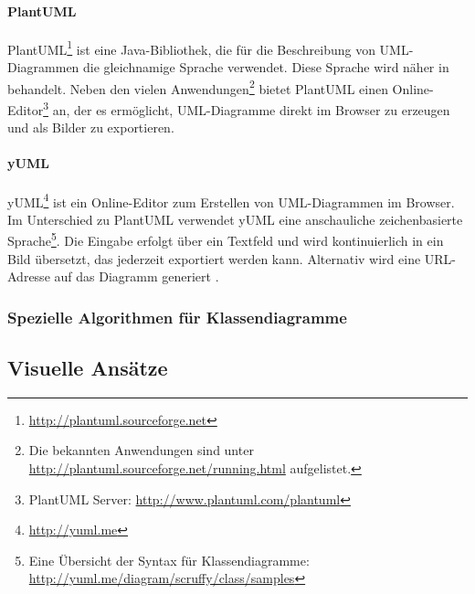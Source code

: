 \paragraph{PlantUML}


PlantUML\footnote{\url{http://plantuml.sourceforge.net}} ist eine Java-Bibliothek, die für die Beschreibung von UML-Diagrammen die gleichnamige Sprache verwendet. Diese Sprache wird näher in \cite{Roques10Drawing} behandelt. Neben den vielen Anwendungen\footnote{Die bekannten Anwendungen sind unter \url{http://plantuml.sourceforge.net/running.html} aufgelistet.} bietet PlantUML einen Online-Editor\footnote{PlantUML Server: \url{http://www.plantuml.com/plantuml}} an, der es ermöglicht, UML-Diagramme direkt im Browser zu erzeugen und als Bilder zu exportieren.

\paragraph{yUML}

yUML\footnote{\url{http://yuml.me}} ist ein Online-Editor zum Erstellen von UML-Diagrammen im Browser. Im Unterschied zu PlantUML verwendet yUML eine anschauliche zeichenbasierte Sprache\footnote{Eine Übersicht der Syntax für Klassendiagramme: \url{http://yuml.me/diagram/scruffy/class/samples}}. Die Eingabe erfolgt über ein Textfeld und wird kontinuierlich in ein Bild übersetzt, das jederzeit exportiert werden kann. Alternativ wird eine URL-Adresse auf das Diagramm generiert \cite{Fuhrmann11On-the-Pragmatics}.

\subsubsection{Spezielle Algorithmen für Klassendiagramme}





\subsection{Visuelle Ansätze}
\label{subsec:visual-approaches}

